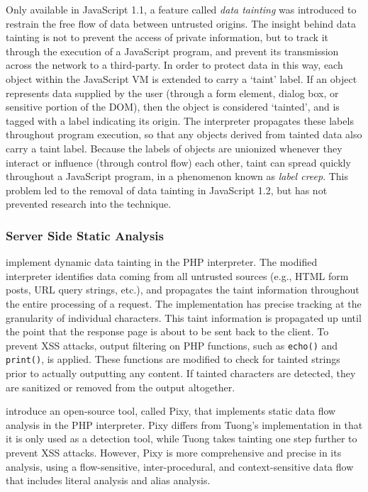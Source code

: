 \documentclass{acmtrans2m}
\begin{document}
Only available in JavaScript 1.1, a feature called \emph{data tainting} was introduced to restrain the free flow of data between untrusted origins.
The insight behind data tainting is not to prevent the access of private information, but to track it through the execution of a JavaScript program, and prevent its transmission across the network to a third-party.
In order to protect data in this way, each object within the JavaScript VM is extended to carry a `taint' label.
If an object represents data supplied by the user (through a form element, dialog box, or sensitive portion of the DOM), then the object is considered `tainted', and is tagged with a label indicating its origin.
The interpreter propagates these labels throughout program execution, so that any objects derived from tainted data also carry a taint label.
Because the labels of objects are unionized whenever they interact or influence (through control flow) each other, taint can spread quickly throughout a JavaScript program, in a phenomenon known as \emph{label creep}.
This problem led to the removal of data tainting in JavaScript 1.2, but has not prevented research into the technique.

\subsubsection*{Server Side Static Analysis}

 implement dynamic data tainting in the PHP interpreter.
The modified interpreter identifies data coming from all untrusted sources (e.g., HTML form posts, URL query strings, etc.), and propagates the taint information throughout the entire processing of a request.
The implementation has precise tracking at the granularity of individual characters.
This taint information is propagated up until the point that the response page is about to be sent back to the client.
To prevent XSS attacks, output filtering on PHP functions, such as \texttt{echo()} and \texttt{print()}, is applied.
These functions are modified to check for tainted strings prior to actually outputting any content.
If tainted characters are detected, they are sanitized or removed from the output altogether.

 introduce an open-source tool, called Pixy, that implements static data flow analysis in the PHP interpreter.
Pixy differs from Tuong's implementation in that it is only used as a detection tool, while Tuong takes tainting one step further to prevent XSS attacks.
However, Pixy is more comprehensive and precise in its analysis, using a flow-sensitive, inter-procedural, and context-sensitive data flow that includes literal analysis and alias analysis.
\end{document}

